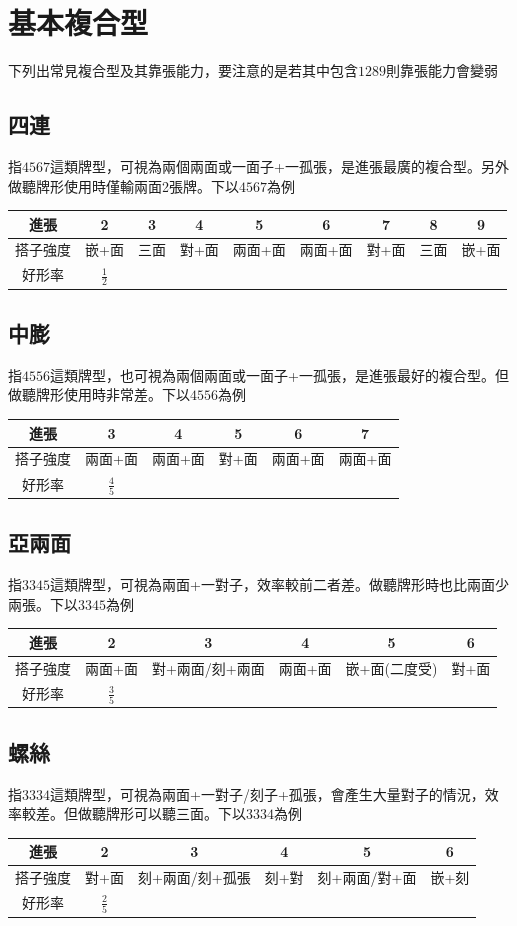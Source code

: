 \documentclass[a4paper,12pt]{article}
\begin{document}
\section{基本複合型}
下列出常見複合型及其靠張能力，要注意的是若其中包含$1289$則靠張能力會變弱
\subsection{四連}
指$4567$這類牌型，可視為兩個兩面或一面子+一孤張，是進張最廣的複合型。另外做聽牌形使用時僅輸兩面2張牌。下以$4567$為例 \\
\begin{tabular} {c||c|c|c|c|c|c|c|c}
    進張 & 2 & 3 & 4 & 5 & 6 & 7 & 8 & 9 \\ 
    \hline
    搭子強度 & 嵌+面 & 三面 & 對+面 & 兩面+面 & 兩面+面 & 對+面 & 三面 & 嵌+面 \\
    好形率 & $\frac{1}{2}$ \\
\end{tabular}
\subsection{中膨}
指$4556$這類牌型，也可視為兩個兩面或一面子+一孤張，是進張最好的複合型。但做聽牌形使用時非常差。下以$4556$為例 \\
\begin{tabular} {c||c|c|c|c|c}
    進張 & 3 & 4 & 5 & 6 & 7 \\ 
    \hline
    搭子強度 & 兩面+面 & 兩面+面 & 對+面 & 兩面+面 & 兩面+面 \\
    好形率 & $\frac{4}{5}$ \\
\end{tabular}
\subsection{亞兩面}
指$3345$這類牌型，可視為兩面+一對子，效率較前二者差。做聽牌形時也比兩面少兩張。下以$3345$為例 \\
\begin{tabular} {c||c|c|c|c|c}
    進張 & 2 & 3 & 4 & 5 & 6 \\ 
    \hline
    搭子強度 & 兩面+面 & 對+兩面/刻+兩面 & 兩面+面 & 嵌+面(二度受) & 對+面 \\
    好形率 & $\frac{3}{5}$ \\
\end{tabular}
\subsection{螺絲}
指$3334$這類牌型，可視為兩面+一對子/刻子+孤張，會產生大量對子的情況，效率較差。但做聽牌形可以聽三面。下以$3334$為例 \\
\begin{tabular} {c||c|c|c|c|c}
    進張 & 2 & 3 & 4 & 5 & 6 \\ 
    \hline
    搭子強度 & 對+面 & 刻+兩面/刻+孤張 & 刻+對 & 刻+兩面/對+面 & 嵌+刻 \\
    好形率 & $\frac{2}{5}$ \\
\end{tabular}
\end{document}

